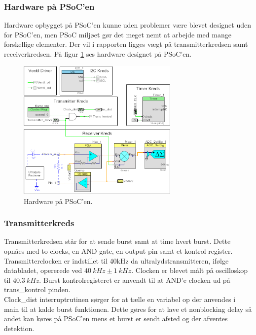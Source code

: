 \subsubsection{Hardware på PSoC'en}
Hardware opbygget på PSoC'en kunne uden problemer være blevet designet uden for PSoC'en, men PSoC miljøet gør det meget nemt at arbejde med mange forskellige elementer. Der vil i rapporten ligges vægt på transmitterkredsen samt receiverkredsen. På figur \ref{fig:PSOCHW} ses hardware designet på PSoC'en.
\begin{figure}[H]
\centering
\includegraphics[width=0.7\textwidth]{billeder/PSOC_Hardware}
\caption{Hardware på PSoC'en.}
\label{fig:PSOCHW}
\end{figure}
\subsubsection{Transmitterkreds}
Transmitterkredsen står for at sende burst samt at time hvert burst.  Dette opnåes med to clocks, en AND gate, en output pin samt et kontrol register. Transmitterclocken er indstillet til 40kHz da ultralydstransmitteren, ifølge databladet, opererede ved $\SI{40}{kHz}\pm\SI{1}{kHz}$. Clocken er blevet målt på oscilloskop til $\SI{40.3}{kHz}$. Burst kontrolregisteret er anvendt til at AND'e clocken ud på trans\_kontrol pinden.\\
Clock\_dist interruptrutinen sørger for at tælle en variabel op der anvendes i main til at kalde burst funktionen. Dette gøres for at lave et nonblocking delay så andet kan køres på PSoC'en mens et burst er sendt afsted og der afventes detektion.

